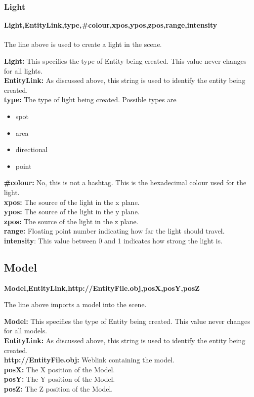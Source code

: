 \documentclass[a4paper,12pt]{article}
\begin{document}
\subsubsection{Light}

\textbf{Light,EntityLink,type,\#colour,xpos,ypos,zpos,range,intensity}\\\\

The line above is used to create a light in the scene.

\textbf{Light:} This specifies the type of Entity being created. This value never changes for all lights.\\
\textbf{EntityLink:} As discussed above, this string is used to identify the entity being created.\\
\textbf{type:} The type of light being created. Possible types are
\begin{itemize}
\item spot
\item area
\item directional
\item point
\end{itemize}
\textbf{\#colour:} No, this is not a hashtag. This is the hexadecimal colour used for the light.\\
\textbf{xpos:} The source of the light in the x plane.\\
\textbf{ypos:} The source of the light in the y plane.\\
\textbf{zpos:} The source of the light in the z plane.\\
\textbf{range:} Floating point number indicating how far the light should travel.\\
\textbf{intensity}: This value between 0 and 1 indicates how strong the light is.

\subsection{Model}

\textbf{Model,EntityLink,http://EntityFile.obj,posX,posY,posZ}

The line above imports a model into the scene.

\textbf{Model:} This specifies the type of Entity being created. This value never changes for all models.\\
\textbf{EntityLink:} As discussed above, this string is used to identify the entity being created.\\
\textbf{http://EntityFile.obj:} Weblink containing the model.\\
\textbf{posX:} The X position of the Model.\\
\textbf{posY:} The Y position of the Model.\\
\textbf{posZ:} The Z position of the Model.\\
\end{document}
